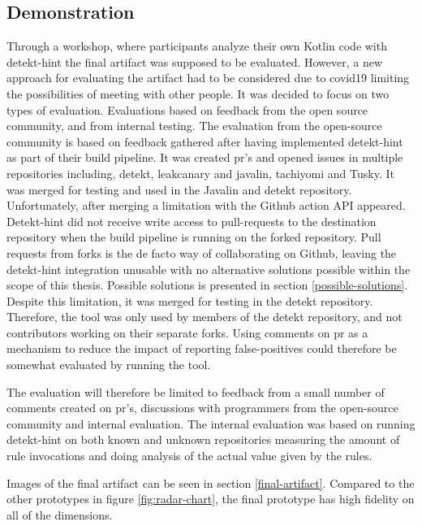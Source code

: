 \documentclass{report}
\begin{document}
\subsection*{Demonstration}

Through a workshop, where participants analyze their own Kotlin code with detekt-hint the final artifact was supposed to be evaluated. However, a new approach for evaluating the artifact had to be considered due to \gls{covid19} limiting the possibilities of meeting with other people. It was decided to focus on two types of evaluation. Evaluations based on feedback from the open source community, and from internal testing. The evaluation from the open-source community is based on feedback gathered after having implemented detekt-hint as part of their build pipeline. It was created \gls{pr}'s and opened issues in multiple repositories including, detekt\cite{detekt}, leakcanary\cite{leakcanary}  and javalin\cite{javalin}, tachiyomi\cite{tachiyomi} and Tusky\cite{tusky}. It was merged for testing and used in the Javalin and detekt repository. Unfortunately, after merging a limitation with the Github action API appeared. Detekt-hint did not receive write access to pull-requests to the destination repository when the build pipeline is running on the forked repository. Pull requests from forks is the de facto way of collaborating on Github, leaving the detekt-hint integration unusable with no alternative solutions possible within the scope of this thesis. Possible solutions is presented in 
section \ref{possible-solutions}. Despite this limitation, it was merged for testing in the detekt repository. Therefore, the tool was only used by members of the detekt repository, and not contributors working on their separate forks. Using comments on \gls{pr} as a mechanism to reduce the impact of reporting false-positives could therefore be somewhat evaluated by running the tool.

The evaluation will therefore be limited to feedback from a small number of comments created on \gls{pr}'s, discussions with programmers from the open-source community and internal evaluation. The internal evaluation was based on running detekt-hint on both known and unknown repositories measuring the amount of rule invocations and doing analysis of the actual value given by the rules. 

Images of the final artifact can be seen in section \ref{final-artifact}. Compared to the other prototypes in figure \ref{fig:radar-chart}, the final prototype has high fidelity on all of the dimensions. 
\end{document}
